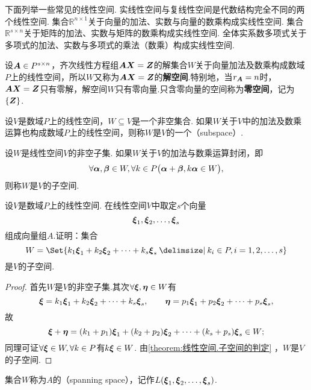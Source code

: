 \begin{example}
下面列举一些常见的线性空间.
实线性空间与复线性空间是代数结构完全不同的两个线性空间.
集合\(\mathbb{R}^{n \times 1}\)关于向量的加法、实数与向量的数乘构成实线性空间.
集合\(\mathbb{R}^{s \times n}\)关于矩阵的加法、实数与矩阵的数乘构成实线性空间.
全体实系数多项式关于多项式的加法、实数与多项式的乘法（数乘）构成实线性空间.
\end{example}

\begin{example}
设\(\boldsymbol{A} \in P^{s \times n}\)，齐次线性方程组\(\boldsymbol{A}\boldsymbol{X}=\boldsymbol{Z}\)的解集合\(W\)关于向量加法及数乘构成数域\(P\)上的线性空间，所以\(W\)又称为\(\boldsymbol{A}\boldsymbol{X}=\boldsymbol{Z}\)的\textbf{解空间}.特别地，当\(r_{\boldsymbol{A}}=n\)时，\(\boldsymbol{A}\boldsymbol{X}=\boldsymbol{Z}\)只有零解，解空间\(W\)只有零向量.只含零向量的空间称为\textbf{零空间}，记为\(\{\boldsymbol{Z}\}\).
\end{example}

\begin{definition}
设\(V\)是数域\(P\)上的线性空间，\(W \subseteq V\)是一个非空集合.
如果\(W\)关于\(V\)中的加法及数乘运算也构成数域\(P\)上的线性空间，则称\(W\)是\(V\)的一个（subspace）.
\end{definition}

\begin{theorem}\label{theorem:线性空间.子空间的判定}
设\(W\)是线性空间\(V\)的非空子集.
如果\(W\)关于\(V\)的加法与数乘运算封闭，即\[
\forall \boldsymbol{\alpha},\boldsymbol{\beta} \in W,
\forall k \in P
\bigl(
\boldsymbol{\alpha}+\boldsymbol{\beta}, k \boldsymbol{\alpha} \in W
\bigr),
\]则称\(W\)是\(V\)的子空间.
\end{theorem}

\begin{example}
设\(V\)是数域\(P\)上的线性空间.
在线性空间\(V\)中取定\(s\)个向量\[
\boldsymbol{\xi}_1,\boldsymbol{\xi}_2,\dotsc,\boldsymbol{\xi}_s
\]组成向量组\(A\).证明：集合\[
W = \Set{ k_1 \a_1 + k_2 \a_2 + \dotsb + k_s \a_s \given k_i \in P, i=1,2,\dotsc,s }
\]是\(V\)的子空间.
\begin{proof}
首先\(W\)是\(V\)的非空子集.其次\(\forall \boldsymbol{\xi},\boldsymbol{\eta} \in W\)有\[
\boldsymbol{\xi} = k_1 \boldsymbol{\xi}_1 + k_2 \boldsymbol{\xi}_2 + \dotsb + k_s \boldsymbol{\xi}_s,
\qquad
\boldsymbol{\eta} = p_1 \boldsymbol{\xi}_1 + p_2 \boldsymbol{\xi}_2 + \dotsb + p_s \boldsymbol{\xi}_s,
\]故\[
\boldsymbol{\xi}+\boldsymbol{\eta} = (k_1+p_1)\boldsymbol{\xi}_1 + (k_2+p_2)\boldsymbol{\xi}_2 + \dotsb + (k_s+p_s)\boldsymbol{\xi}_s \in W;
\]同理可证\(\forall \boldsymbol{\xi} \in W, \forall k \in P\)有\(k\boldsymbol{\xi} \in W\).
由\cref{theorem:线性空间.子空间的判定} ，\(W\)是\(V\)的子空间.
\end{proof}
集合\(W\)称为\(A\)的（spanning space），记作\(L(\boldsymbol{\xi}_1,\boldsymbol{\xi}_2,\dotsc,\boldsymbol{\xi}_s)\).
\end{example}

